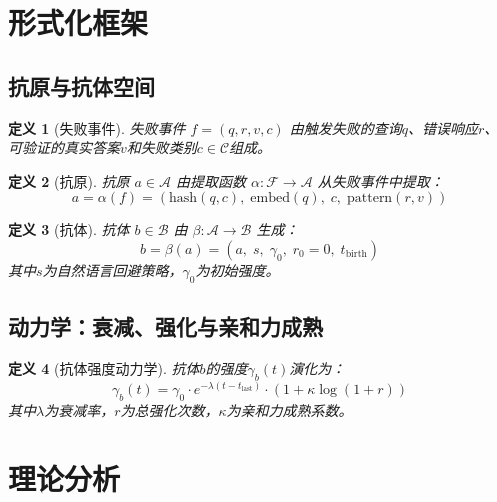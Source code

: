 \documentclass[11pt,a4paper]{article}
\newtheorem{definition}{定义}
\begin{document}
\section{形式化框架}

\subsection{抗原与抗体空间}

\begin{definition}[失败事件]
失败事件 $f = (q, r, v, c)$ 由触发失败的查询$q$、错误响应$r$、可验证的真实答案$v$和失败类别$c \in \mathcal{C}$组成。
\end{definition}

\begin{definition}[抗原]
抗原 $a \in \mathcal{A}$ 由提取函数 $\alpha: \mathcal{F} \to \mathcal{A}$ 从失败事件中提取：
\begin{equation}
  a = \alpha(f) = \left(\text{hash}(q, c), \;\text{embed}(q),\; c, \;\text{pattern}(r, v)\right)
\end{equation}
\end{definition}

\begin{definition}[抗体]
抗体 $b \in \mathcal{B}$ 由 $\beta: \mathcal{A} \to \mathcal{B}$ 生成：
\begin{equation}
  b = \beta(a) = \left(a,\; s,\; \gamma_0,\; r_0 = 0,\; t_{\text{birth}}\right)
\end{equation}
其中$s$为自然语言回避策略，$\gamma_0$为初始强度。
\end{definition}

\subsection{动力学：衰减、强化与亲和力成熟}

\begin{definition}[抗体强度动力学]
抗体$b$的强度$\gamma_b(t)$演化为：
\begin{equation}
  \gamma_b(t) = \gamma_0 \cdot e^{-\lambda(t - t_{\text{last}})} \cdot (1 + \kappa \log(1 + r))
\end{equation}
其中$\lambda$为衰减率，$r$为总强化次数，$\kappa$为亲和力成熟系数。
\end{definition}

\section{理论分析}
\end{document}

